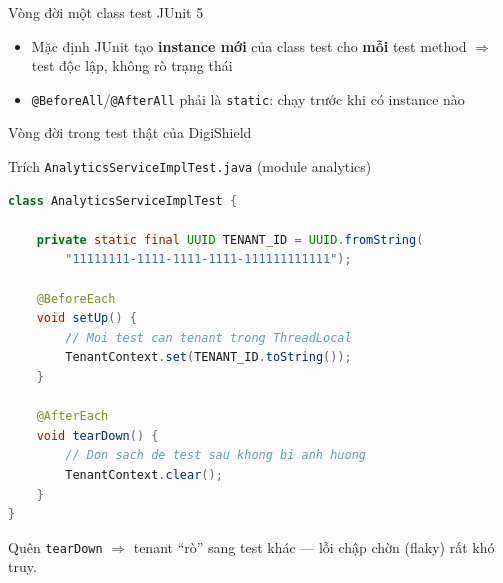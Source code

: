 \documentclass[aspectratio=169,12pt]{beamer}
\begin{document}
\begin{frame}[shrink=8]{Vòng đời một class test JUnit 5}
  \begin{center}
  \end{center}

  \begin{itemize}
    \item Mặc định JUnit tạo \textbf{instance mới} của class test cho
          \textbf{mỗi} test method \(\Rightarrow\) test độc lập, không rò trạng thái
    \item \texttt{@BeforeAll}/\texttt{@AfterAll} phải là \texttt{static}:
          chạy trước khi có instance nào
  \end{itemize}
\end{frame}

\begin{frame}[fragile,shrink=8]{Vòng đời trong test thật của DigiShield}
  \begin{block}{\small Trích \texttt{AnalyticsServiceImplTest.java} (module analytics)}
\begin{lstlisting}[language=java]
class AnalyticsServiceImplTest {

    private static final UUID TENANT_ID = UUID.fromString(
        "11111111-1111-1111-1111-111111111111");

    @BeforeEach
    void setUp() {
        // Moi test can tenant trong ThreadLocal
        TenantContext.set(TENANT_ID.toString());
    }

    @AfterEach
    void tearDown() {
        // Don sach de test sau khong bi anh huong
        TenantContext.clear();
    }
}
\end{lstlisting}
  \end{block}
  \vspace{-0.3em}
  {\small Quên \texttt{tearDown} \(\Rightarrow\) tenant ``rò'' sang test khác
  --- lỗi chập chờn (flaky) rất khó truy.}
\end{frame}
\end{document}
